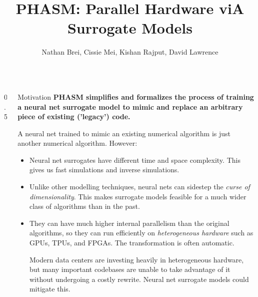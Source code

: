 \documentclass[final]{beamer}
\title{PHASM: Parallel Hardware viA Surrogate Models} %
\author{Nathan Brei, Cissie Mei, Kishan Rajput, David Lawrence} %
\institute{Jefferson Lab} %
\newlength{\sepwid}
\newlength{\onecolwid}
\begin{document}

\setlength{\belowcaptionskip}{1ex} %
\setlength\belowdisplayshortskip{1ex} %

\begin{frame}[fragile,t] %

\begin{columns}[t] %

\begin{column}{0.5\sepwid}\end{column} %

\begin{column}{\onecolwid} %


\begin{block}{Motivation}
\textbf{PHASM simplifies and formalizes the process of training a neural net surrogate model to mimic and replace an arbitrary piece of existing ('legacy') code.}


A neural net trained to mimic an existing numerical algorithm is just another numerical algorithm. However:
\begin{itemize}
\item Neural net surrogates have different time and space complexity. This gives us fast simulations and inverse simulations.

\item Unlike other modelling techniques, neural nets can sidestep the \emph{curse of dimensionality}. This makes surrogate models feasible for a much wider class of algorithms than in the past.

\item They can have much higher internal parallelism than the original algorithms, so they can run efficiently on \emph{heterogeneous hardware} such as GPUs, TPUs, and FPGAs. The transformation is often automatic.

Modern data centers are investing heavily in heterogeneous hardware, but many important codebases are unable to take advantage of it without undergoing a costly rewrite. Neural net surrogate models could mitigate this.
\end{itemize}
\end{block}


\end{column}
\end{columns}
\end{frame}
\end{document}
